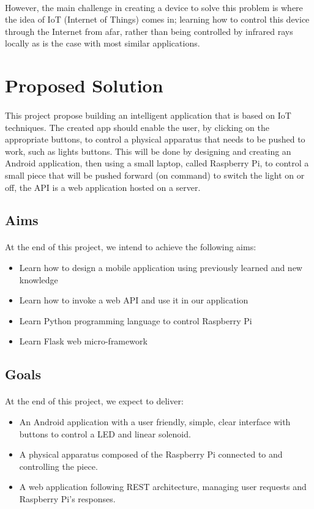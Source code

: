 \documentclass[12pt, oneside, a4paper]{book}
\begin{document}
		\paragraph{}However, the main challenge in creating a device to solve this problem is where the idea of IoT (Internet of Things) comes in; learning how to control this device through the Internet from afar, rather than being controlled by infrared rays locally as is the case with most similar applications. 
		\section{Proposed Solution}
		\paragraph{}This project propose building an intelligent application that is based on IoT techniques. The created app should enable the user, by clicking on the appropriate buttons, to control a physical apparatus that needs to be pushed to work, such as lights buttons. This will be done by designing and creating an Android application, then using a small laptop, called Raspberry Pi, to control a small piece that will be pushed forward (on command) to switch the light on or off, the API is a web application hosted on a server.
		
		\subsection{Aims}
			\paragraph{}At the end of this project, we intend to achieve the following aims:
			\begin{itemize}
	 			\item Learn how to design a mobile application using previously learned and new knowledge
				\item Learn how to invoke a web API and use it in our application
				\item Learn Python programming language to control Raspberry Pi
				\item Learn Flask web micro-framework
			\end{itemize}
		\subsection{Goals}
			\paragraph{} At the end of this project, we expect to deliver:
			\begin{itemize}
				\item An Android application with a user friendly, simple, clear interface with buttons to control a LED and linear solenoid.
				\item A physical apparatus composed of the Raspberry Pi connected to and controlling the piece.
				\item A web application following REST architecture, managing user  requests and Raspberry Pi's responses.
			\end{itemize}
\end{document}
